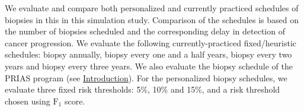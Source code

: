 We evaluate and compare both personalized and currently practiced schedules of biopsies in this in this simulation study. Comparison of the schedules is based on the number of biopsies scheduled and the corresponding delay in detection of cancer progression. We evaluate the following currently-practiced fixed/heuristic schedules: biopsy annually, biopsy every one and a half years, biopsy every two years and biopsy every three years. We also evaluate the biopsy schedule of the PRIAS program (see \hyperref[sec:introduction]{Introduction}). For the personalized biopsy schedules, we evaluate three fixed risk thresholds: 5\%, 10\% and 15\%, and a risk threshold chosen using $\mbox{F}_1$ score.